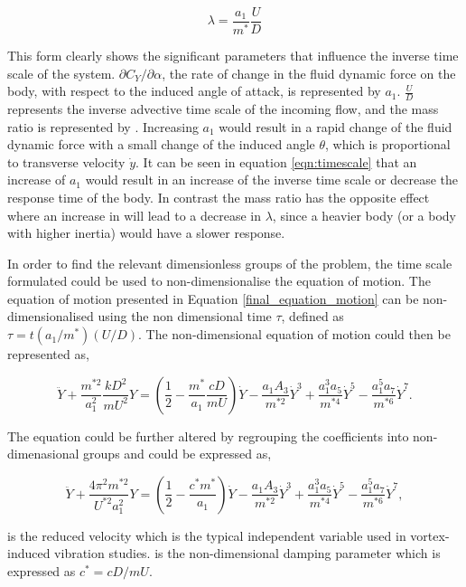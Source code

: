 \begin{equation}
	\label{eqn:timescale}
	\lambda = \frac{a_1}{m^*}\frac{U}{D}
\end{equation}

This form clearly shows the significant parameters that influence the inverse time scale of the system. $\partial C_Y / \partial \alpha $, the rate of change in the fluid dynamic force on the body, with respect to the induced angle of attack, is represented by $a_1$. $\frac{U}{D}$ represents the inverse advective time scale of the incoming flow, and the mass ratio is represented by \mstar. Increasing $a_1$ would result in a rapid change of the fluid dynamic force with a small change of the induced angle $\theta$, which is proportional to transverse velocity $\dot{y}$. It can be seen in equation \ref{eqn:timescale} that an increase of $a_{1}$ would result in an increase of the inverse time scale or decrease the response time of the body. In contrast the mass ratio has the opposite effect where an increase in \mstar will lead to a decrease in $\lambda$, since a heavier body (or a body with higher inertia) would have a slower response. 

In order to find the relevant dimensionless groups of the problem, the time scale formulated could be used to non-dimensionalise the equation of motion. The equation of motion presented in Equation \ref{final_equation_motion} can be non-dimensionalised using the non dimensional time $\tau$, defined as $\tau=t(a_1/m^*)(U/D)$. The non-dimensional equation of motion could then be represented as, 

\begin{equation}
	\label{eqn:eom_nondim}
	\ddot{Y} + \frac{m^{*2}}{a_1^2}\frac{kD^2}{mU^2}Y = \left(\frac{1}{2} - \frac{m^*}{a_1}\frac{cD}{mU}\right)\dot{Y} - \frac{a_1A_3}{m^{*2}}\dot{Y}^3 + \frac{a_1^3a_5}{m^{*4}}\dot{Y}^5 - \frac{a_1^5a_7}{m^{*6}}\dot{Y}^7.
\end{equation}

The equation could be further altered by regrouping the coefficients into non-dimenasional groups and could be expressed as, 

\begin{equation}
	\label{eqn:eom_nondim_regroup}
	\ddot{Y} + \frac{4\pi^{2}m^{*2}}{U^{*2}a_1^2}Y = \left(\frac{1}{2} - \frac{c^*m^*}{a_1}\right)\dot{Y} - \frac{a_1A_3}{m^{*2}}\dot{Y}^3 + \frac{a_1^3a_5}{m^{*4}}\dot{Y}^5 - \frac{a_1^5a_7}{m^{*6}}\dot{Y}^7,
\end{equation}  

\ustar is the reduced velocity which is the typical independent variable used in vortex-induced vibration studies. \cstar is the non-dimensional damping parameter which is expressed as $c^*=cD/mU$. 

